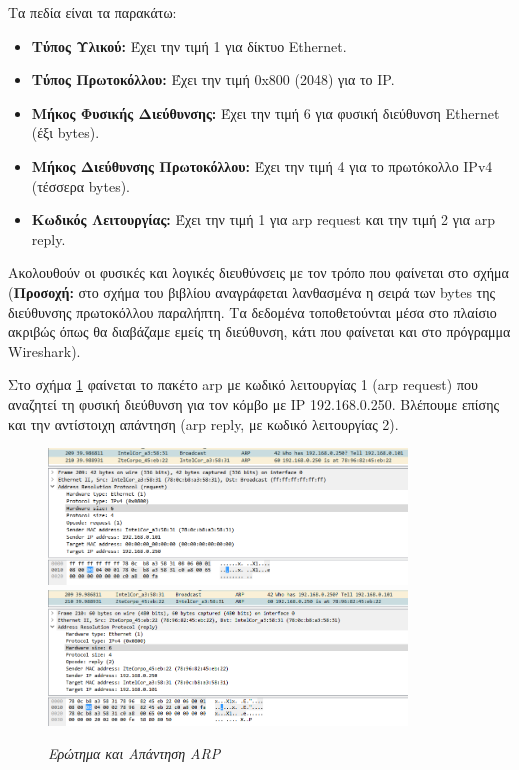 Τα πεδία είναι τα παρακάτω:

\begin{itemize}
\item \textbf{Τύπος Υλικού:} Έχει την τιμή 1 για δίκτυο Ethernet.
\item \textbf{Τύπος Πρωτοκόλλου:} Έχει την τιμή 0x800 (2048) για το IP.
\item \textbf{Μήκος Φυσικής Διεύθυνσης:} Έχει την τιμή 6 για φυσική διεύθυνση Ethernet (έξι bytes).
\item \textbf{Μήκος Διεύθυνσης Πρωτοκόλλου:} Έχει την τιμή 4 για το πρωτόκολλο IPv4 (τέσσερα bytes).
\item \textbf{Κωδικός Λειτουργίας:} Έχει την τιμή 1 για arp request και την τιμή 2 για arp reply.
\end{itemize}

Ακολουθούν οι φυσικές και λογικές διευθύνσεις με τον τρόπο που φαίνεται στο σχήμα (\textbf{Προσοχή:} στο σχήμα του βιβλίου αναγράφεται λανθασμένα η σειρά των bytes της διεύθυνσης πρωτοκόλλου παραλήπτη. Τα δεδομένα τοποθετούνται μέσα στο πλαίσιο ακριβώς όπως θα διαβάζαμε εμείς τη διεύθυνση, κάτι που φαίνεται και στο πρόγραμμα Wireshark).

Στο σχήμα \ref{3-12} φαίνεται το πακέτο arp με κωδικό λειτουργίας 1 (arp request) που αναζητεί τη φυσική διεύθυνση για τον κόμβο με IP 192.168.0.250. Bλέπουμε επίσης και την αντίστοιχη απάντηση (arp reply, με κωδικό λειτουργίας 2).

\begin{figure}[!ht]
 \centering
 \includegraphics[width=0.85\textwidth]{images/chapter3/3-12}
 \includegraphics[width=0.85\textwidth]{images/chapter3/3-13}
 \caption {\textsl{Ερώτημα και Απάντηση ARP}}
 \label{3-12}
\end{figure}

